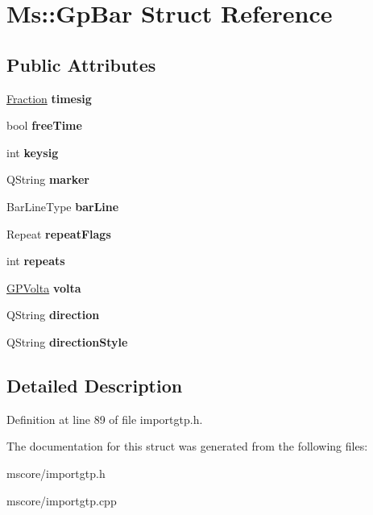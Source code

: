 \hypertarget{struct_ms_1_1_gp_bar}{}\section{Ms\+:\+:Gp\+Bar Struct Reference}
\label{struct_ms_1_1_gp_bar}
\subsection*{Public Attributes}
\begin{DoxyCompactItemize}
\item 
\mbox{\label{struct_ms_1_1_gp_bar_aff66ac41ff3053fef4431c9f0af9b950}} 
\hyperlink{class_ms_1_1_fraction}{Fraction} {\bfseries timesig}
\item 
\mbox{\label{struct_ms_1_1_gp_bar_a5c534211b6540d752bb5b94612312e35}} 
bool {\bfseries free\+Time}
\item 
\mbox{\label{struct_ms_1_1_gp_bar_a60c3613f79b98ec6fd1c25464d2e2ccc}} 
int {\bfseries keysig}
\item 
\mbox{\label{struct_ms_1_1_gp_bar_ad14238dca7a21341c07b3dea124eead5}} 
Q\+String {\bfseries marker}
\item 
\mbox{\label{struct_ms_1_1_gp_bar_a114b18ed53f0073bbf8cf1c94e3adc75}} 
Bar\+Line\+Type {\bfseries bar\+Line}
\item 
\mbox{\label{struct_ms_1_1_gp_bar_ad02d52105a5bc9118e15cd61d5e07921}} 
Repeat {\bfseries repeat\+Flags}
\item 
\mbox{\label{struct_ms_1_1_gp_bar_a25e94abf3b3fe3dad23151d9f88d6e26}} 
int {\bfseries repeats}
\item 
\mbox{\label{struct_ms_1_1_gp_bar_a22efd4b5583ca8678662d7a7e2b3dfcb}} 
\hyperlink{struct_ms_1_1_g_p_volta}{G\+P\+Volta} {\bfseries volta}
\item 
\mbox{\label{struct_ms_1_1_gp_bar_acd7a403c8694dd744bb802c4a1810c97}} 
Q\+String {\bfseries direction}
\item 
\mbox{\label{struct_ms_1_1_gp_bar_a121b912d3766f565e7632b3367871513}} 
Q\+String {\bfseries direction\+Style}
\end{DoxyCompactItemize}


\subsection{Detailed Description}


Definition at line 89 of file importgtp.\+h.



The documentation for this struct was generated from the following files\+:\begin{DoxyCompactItemize}
\item 
mscore/importgtp.\+h\item 
mscore/importgtp.\+cpp\end{DoxyCompactItemize}
